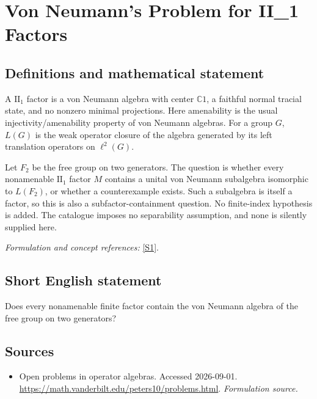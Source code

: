 \documentclass[11pt]{article}
\begin{document}
\section*{\texorpdfstring{Von Neumann's Problem for II\_1 Factors}{Von Neumann's Problem for II\_1 Factors}}\label{439}
\subsection{Definitions and mathematical statement}
A $\mathrm{II}_1$ factor is a von Neumann algebra with center ${\mathbb{C}}1$, a faithful normal tracial state, and no nonzero minimal projections. Here amenability is the usual injectivity/amenability property of von Neumann algebras. For a group $G$, $L(G)$ is the weak operator closure of the algebra generated by its left translation operators on $\ell^2(G)$.

Let $F_2$ be the free group on two generators. The question is whether every nonamenable $\mathrm{II}_1$ factor $M$ contains a unital von Neumann subalgebra isomorphic to $L(F_2)$, or whether a counterexample exists. Such a subalgebra is itself a factor, so this is also a subfactor-containment question. No finite-index hypothesis is added. The catalogue imposes no separability assumption, and none is silently supplied here.
\par\smallskip\textit{Formulation and concept references:} \href{https://math.vanderbilt.edu/peters10/problems.html}{[S1]}.

\subsection{Short English statement}
Does every nonamenable finite factor contain the von Neumann algebra of the free group on two generators?
\subsection{Sources}
\begin{itemize}
\item[S1]Open problems in operator algebras. Accessed 2026-09-01.
\url{https://math.vanderbilt.edu/peters10/problems.html}.
\textit{Formulation source.}
\end{itemize}
\end{document}
